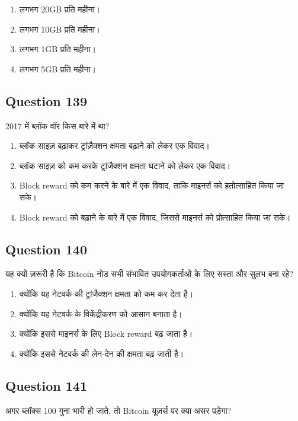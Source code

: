\documentclass[12pt,a4paper]{article}
\begin{document}
\begin{enumerate}[label=\Alph*., leftmargin=*]
\item लगभग 20GB प्रति महीना।
\item लगभग 10GB प्रति महीना।
\item लगभग 1GB प्रति महीना।
\item लगभग 5GB प्रति महीना।
\end{enumerate}

\bigskip


\subsection*{Question 139}
2017 में ब्लॉक वॉर किस बारे में था?

\begin{enumerate}[label=\Alph*., leftmargin=*]
\item ब्लॉक साइज़ बढ़ाकर ट्रांज़ैक्शन क्षमता बढ़ाने को लेकर एक विवाद।
\item ब्लॉक साइज़ को कम करके ट्रांजैक्शन क्षमता घटाने को लेकर एक विवाद।
\item Block reward को कम करने के बारे में एक विवाद, ताकि माइनर्स को हतोत्साहित किया जा सके।
\item Block reward को बढ़ाने के बारे में एक विवाद, जिससे माइनर्स को प्रोत्साहित किया जा सके।
\end{enumerate}

\bigskip


\subsection*{Question 140}
यह क्यों ज़रूरी है कि Bitcoin नोड सभी संभावित उपयोगकर्ताओं के लिए सस्ता और सुलभ बना रहे?

\begin{enumerate}[label=\Alph*., leftmargin=*]
\item क्योंकि यह नेटवर्क की ट्रांजैक्शन क्षमता को कम कर देता है।
\item क्योंकि यह नेटवर्क के विकेंद्रीकरण को आसान बनाता है।
\item क्योंकि इससे माइनर्स के लिए Block reward बढ़ जाता है।
\item क्योंकि इससे नेटवर्क की लेन-देन की क्षमता बढ़ जाती है।
\end{enumerate}

\bigskip


\subsection*{Question 141}
अगर ब्लॉक्स 100 गुना भारी हो जाते, तो Bitcoin यूज़र्स पर क्या असर पड़ेगा?
\end{document}
